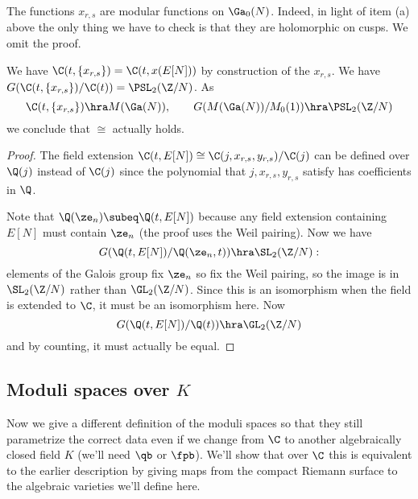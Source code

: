 \begin{rem}
The functions $x_{r,s}$ are modular functions on $\Ga_0(N)$. Indeed, in light of item (a) above the only thing we have to check is that they are holomorphic on cusps. We omit the proof.

We have $\C(t,\{x_{r,s}\})=\C(t,x(E[N]))$ by construction of the $x_{r,s}$. We have $G(\C(t,\{x_{r,s}\})/\C(t))=\PSL_2(\Z/N)$. As 
\[
\C(t,\{x_{r,s}\})\hra M(\Ga(N)),\qquad
G(M(\Ga(N))/M_0(1))\hra \PSL_2(\Z/N)
\]
we conclude that $\cong$ actually holds. %
\end{rem}
\begin{proof}
The field extension $\C(t,E[N])\cong \C(j,x_{r,s},y_{r,s})/\C(j)$ can be defined over $\Q(j)$ instead of $\C(j)$ since the polynomial that $j,x_{r,s},y_{r,s}$ satisfy has coefficients in $\Q$.

Note that $\Q(\ze_n)\subeq \Q(t,E[N])$ because any field extension containing $E[N]$ must contain $\ze_n$ (the proof uses the Weil pairing). Now we have 
\[G(\Q(t,E[N])/\Q(\ze_n,t))\hra \SL_2(\Z/N):\]
 elements of the Galois group fix $\ze_n$ so fix the Weil pairing, so the image is in $\SL_2(\Z/N)$ rather than $\GL_2(\Z/N)$. Since this is an isomorphism when the field is extended to $\C$, it must be an isomorphism here. Now 
\[G(\Q(t,E[N])/\Q(t))\hra \GL_2(\Z/N)\]
and by counting, it must actually be equal.
\end{proof}

\subsection{Moduli spaces over $K$}
Now we give a different definition of the moduli spaces so that they still parametrize the correct data even if we change from $\C$ to another algebraically closed field $K$ (we'll need $\qb$ or $\fpb$). We'll show that over $\C$ this is equivalent to the earlier description by giving maps from the compact Riemann surface to the algebraic varieties we'll define here. %

